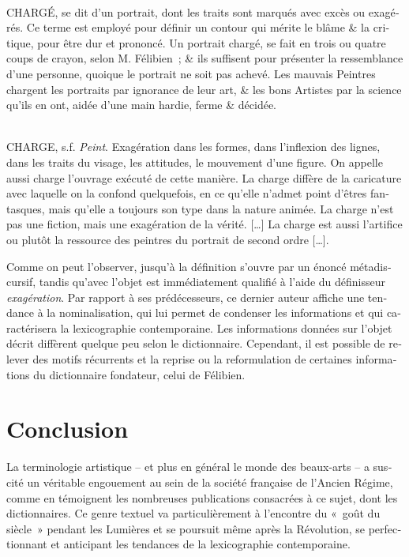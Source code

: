 \documentclass[output=paper,colorlinks,citecolor=brown,arabicfont,chinesefont,booklanguage=french]{langscibook}
\begin{document}
\begin{otherlanguage}{french}
\begin{exe}
\begin{xlist}
\ex \citet{Pernety1757}\\
CHARGÉ, se dit d'un portrait, dont les traits sont marqués avec excès ou exagérés. Ce terme est employé pour définir un contour qui mérite le blâme \& la critique, pour être dur et prononcé. Un portrait chargé, se fait en trois ou quatre coups de crayon, selon M. Félibien~; \& ils suffisent pour présenter la ressemblance d'une personne, quoique le portrait ne soit pas achevé. Les mauvais Peintres chargent les portraits par ignorance de leur art, \& les bons Artistes par la science qu'ils en ont, aidée d'une main hardie, ferme \& décidée.

\ex \citet{Boutard1826}\\
CHARGE, s.f. \emph{Peint}. Exagération dans les formes, dans l’inflexion des lignes, dans les traits du visage, les attitudes, le mouvement d’une figure. On appelle aussi charge l’ouvrage exécuté de cette manière. La charge diffère de la caricature avec laquelle on la confond quelquefois, en ce qu’elle n’admet point d’êtres fantasques, mais qu’elle a toujours son type dans la nature animée. La charge n’est pas une fiction, mais une exagération de la vérité. […] La charge est aussi l’artifice ou plutôt la ressource des peintres du portrait de second ordre […].
\end{xlist}
\end{exe}

Comme on peut l’observer, jusqu’à \citet{Pernety1757} la définition s’ouvre par un énoncé métadiscursif, tandis qu’avec \citet{Boutard1826} l’objet est immédiatement qualifié à l’aide du définisseur \emph{exagération}. Par rapport à ses prédécesseurs, ce dernier auteur affiche une tendance à la nominalisation, qui lui permet de condenser les informations et qui caractérisera la lexicographie contemporaine. Les informations données sur l’objet décrit diffèrent quelque peu selon le dictionnaire. Cependant, il est possible de relever des motifs récurrents et la reprise ou la reformulation de certaines informations du dictionnaire fondateur, celui de Félibien.

\section{Conclusion}

La terminologie artistique – et plus en général le monde des beaux-arts – a suscité un véritable engouement au sein de la société française de l’Ancien Régime, comme en témoignent les nombreuses publications consacrées à ce sujet, dont les dictionnaires. Ce genre textuel va particulièrement à l’encontre du «~goût du siècle~» pendant les Lumières et se poursuit même après la Révolution, se perfectionnant et anticipant les tendances de la lexicographie contemporaine. 


\end{otherlanguage}
\end{document}
